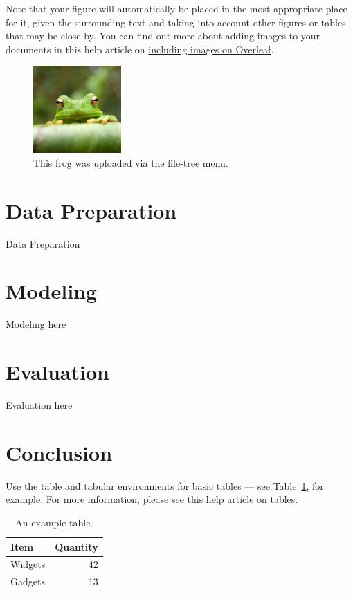 \documentclass{article}
\begin{document}
Note that your figure will automatically be placed in the most appropriate place for it, given the surrounding text and taking into account other figures or tables that may be close by. You can find out more about adding images to your documents in this help article on \href{https://www.overleaf.com/learn/how-to/Including_images_on_Overleaf}{including images on Overleaf}.

\begin{figure}
\centering
\includegraphics[width=0.3\textwidth]{frog.jpg}
\caption{\label{fig:frog}This frog was uploaded via the file-tree menu.}
\end{figure}

\section{Data Preparation}

Data Preparation

\section{Modeling}

Modeling here

\section{Evaluation}

Evaluation here

\section{Conclusion}

Use the table and tabular environments for basic tables --- see Table~\ref{tab:widgets}, for example. For more information, please see this help article on \href{https://www.overleaf.com/learn/latex/tables}{tables}. 

\begin{table}
\centering
\begin{tabular}{l|r}
Item & Quantity \\\hline
Widgets & 42 \\
Gadgets & 13
\end{tabular}
\caption{\label{tab:widgets}An example table.}
\end{table}
\end{document}
